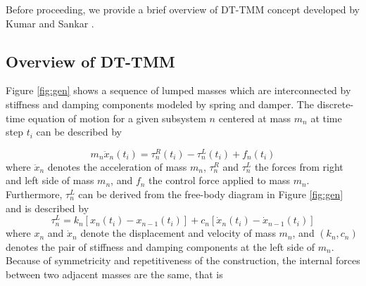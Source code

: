 \documentclass[11pt]{ucthesis}
\newcommand{\beq}{\begin{equation}}
\newcommand{\eeq}{\end{equation}}
\begin{document}
Before proceeding, we provide a brief overview of DT-TMM concept developed by Kumar and Sankar \cite{kumar1986new}.   

\subsection{Overview of DT-TMM}
\label{dt-tmm}
Figure \ref{fig:gen} shows a sequence of lumped masses which are interconnected by stiffness and damping components modeled by spring and damper. The discrete-time equation of motion for a given subsystem $n$ centered at mass $m_n$ at time step $t_i$ can be described by \cite{kumar1986new}

\beq \label{eqn:nEOM}
m_n \ddot{x}_n (t_i)=\tau^R_n(t_i)-\tau^L_n(t_i)+f_n(t_i)
\eeq
where $\ddot{x}_n$ denotes the acceleration of mass $m_n$, $\tau^{R}_{n}$ and $\tau^{L}_{n}$ the forces from right and left side of mass $m_n$, and $f_n$ the control force applied to mass $m_n$. Furthermore, $\tau^{L}_{n}$ can be derived from the free-body diagram in Figure \ref{fig:gen} and is described by
\beq
\tau_n^L = k_n \left[x_n(t_i)-x_{n-1}(t_i)\right]+c_n \left[\dot{x}_n(t_i)-\dot{x}_{n-1}(t_i) \right]
\eeq
where ${x}_n$ and $\dot{x}_n$ denote the displacement and velocity of mass $m_n$, and $(k_n,c_n)$ denotes the pair of stiffness and damping components at the left side of $m_n$. Because of symmetricity and repetitiveness of the construction, the internal forces between two adjacent masses are the same, that is
\end{document}
